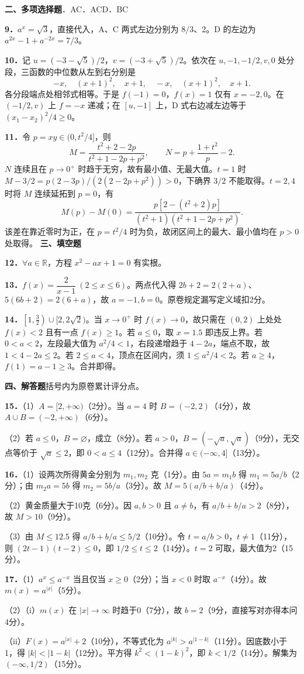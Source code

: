 \documentclass[UTF8,a4paper,12pt]{ctexart}
\newcommand{\subq}[1]{\par（#1）}
\newcommand{\q}[1]{\par\textbf{#1．}}
\begin{document}
\textbf{二、多项选择题}．AC．ACD．BC
\q{9}$a^x=\sqrt3$，直接代入，A、C 两式左边分别为 $8/3$、2。D 的左边为 $a^{2x}-1+a^{-2x}=7/3$。
\q{10}记 $u=(-3-\sqrt5)/2$，$v=(-3+\sqrt5)/2$。依次在 $u,-1,-1/2,v,0$ 处分段，三函数的中位数从左到右分别是
\[
-x,\quad (x+1)^2,\quad x+1,\quad -x,\quad (x+1)^2,\quad x+1.
\]
各分段端点处相邻式相等。于是 $f(-1)=0$，$f(x)=1$ 仅有 $x=-2,0$。在 $(-1/2,v)$ 上 $f=-x$ 递减；在 $[u,-1]$ 上，D 式右边减左边等于 $(x_1-x_2)^2/4\ge0$。
\q{11}令 $p=xy\in(0,t^2/4]$，则
\[
M=\frac{t^2+2-2p}{t^2+1-2p+p^2},\qquad N=p+\frac{1+t^2}{p}-2.
\]
$N$ 连续且在 $p\to0^+$ 时趋于无穷，故有最小值、无最大值。$t=1$ 时 $M-3/2=p(2-3p)/(2(2-2p+p^2))>0$，下确界 $3/2$ 不能取得。$t=2,4$ 时将 $M$ 连续延拓到 $p=0$，有
\[
M(p)-M(0)=\frac{p[2-(t^2+2)p]}{(t^2+1)(t^2+1-2p+p^2)}.
\]
该差在靠近零时为正，在 $p=t^2/4$ 时为负，故闭区间上的最大、最小值均在 $p>0$ 处取得。
\newpage
\textbf{三、填空题}
\q{12}$\forall a\in\mathbb R$，方程 $x^2-ax+1=0$ 有实根。
\q{13}$f(x)=\dfrac2{x-1}\ (2\le x\le6)$。两点代入得 $2b+2=2(2+a)$、$5(6b+2)=2(6+a)$，故 $a=-1,b=0$。原卷规定漏写定义域扣2分。
\q{14}$\left[1,\frac32\right)\cup[2,2\sqrt2)$。当 $x\to0^+$ 时 $f(x)\to0$，故只需在 $(0,2)$ 上处处 $f(x)<2$ 且有一点 $f(x)\ge1$。若 $a\le0$，取 $x=1.5$ 即违反上界。若 $0<a<2$，左段最大值为 $a^2/4<1$，右段递增趋于 $4-2a$，端点不取，故 $1<4-2a\le2$。若 $2\le a<4$，顶点在区间内，须 $1\le a^2/4<2$。若 $a\ge4$，$f(1)=a-1\ge3$。合并即得。
\par\textbf{四、解答题}\quad 括号内为原卷累计评分点。
\q{15}（1）$A=[2,+\infty)$（2分）。当 $a=4$ 时 $B=(-2,2)$（4分），故 $A\cup B=(-2,+\infty)$（6分）。
\subq{2}若 $a\le0$，$B=\varnothing$，成立（8分）。若 $a>0$，$B=(-\sqrt a,\sqrt a)$（9分），无交点等价于 $\sqrt a\le2$，即 $0<a\le4$（12分）。合并得 $a\in(-\infty,4]$（13分）。
\q{16}（1）设两次所得黄金分别为 $m_1,m_2$ 克（1分）。由 $5a=m_1b$ 得 $m_1=5a/b$（2分）；由 $m_2a=5b$ 得 $m_2=5b/a$（3分）。故 $M=5(a/b+b/a)$（4分）。
\subq{2}黄金质量大于10克（6分）。因 $a,b>0$ 且 $a\ne b$，有 $a/b+b/a>2$（8分），故 $M>10$（9分）。
\subq{3}由 $M\le12.5$ 得 $a/b+b/a\le5/2$（10分）。令 $t=a/b>0$，$t\ne1$（11分），则 $(2t-1)(t-2)\le0$，即 $1/2\le t\le2$（14分）。$t=2$ 可取，最大值为2（15分）。
\q{17}（1）$a^x\le a^{-x}$ 当且仅当 $x\ge0$（2分）；当 $x<0$ 时取 $a^{-x}$（4分）。故 $m(x)=a^{|x|}$（5分）。
\subq{2}（i）$m(x)$ 在 $|x|\to\infty$ 时趋于0（7分），故 $b=2$（9分，直接写对亦得本问4分）。
\par （ii）$F(x)=a^{|x|}+2$（10分），不等式化为 $a^{|k|}>a^{|1-k|}$（11分）。因底数小于1，得 $|k|<|1-k|$（12分）。平方得 $k^2<(1-k)^2$，即 $k<1/2$（14分）。解集为 $(-\infty,1/2)$（15分）。
\end{document}

